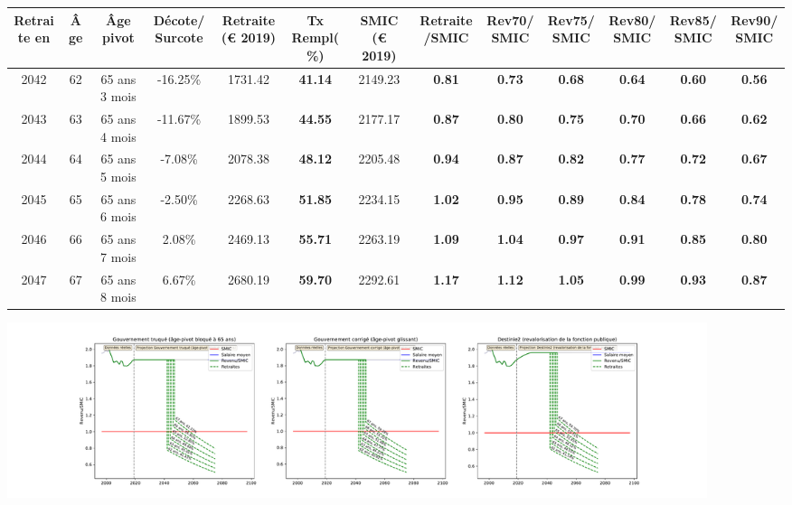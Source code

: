 { \scriptsize \begin{center} 
\begin{tabular}[htb]{|c|c||c|c||c|c||c||c|c|c|c|c|c|} 
\hline 
 Retraite en &  Âge &  Âge pivot &  Décote/Surcote &  Retraite (\euro{} 2019) &  Tx Rempl(\%) &  SMIC (\euro{} 2019) &  Retraite/SMIC &  Rev70/SMIC &  Rev75/SMIC &  Rev80/SMIC &  Rev85/SMIC &  Rev90/SMIC \\ 
\hline \hline 
 2042 &  62 &  65 ans 3 mois &  -16.25\% &  1731.42 &  {\bf 41.14} &  2149.23 &  {\bf {\color{red} 0.81}} &  {\bf {\color{red} 0.73}} &  {\bf {\color{red} 0.68}} &  {\bf {\color{red} 0.64}} &  {\bf {\color{red} 0.60}} &  {\bf {\color{red} 0.56}} \\ 
\hline 
 2043 &  63 &  65 ans 4 mois &  -11.67\% &  1899.53 &  {\bf 44.55} &  2177.17 &  {\bf {\color{red} 0.87}} &  {\bf {\color{red} 0.80}} &  {\bf {\color{red} 0.75}} &  {\bf {\color{red} 0.70}} &  {\bf {\color{red} 0.66}} &  {\bf {\color{red} 0.62}} \\ 
\hline 
 2044 &  64 &  65 ans 5 mois &  -7.08\% &  2078.38 &  {\bf 48.12} &  2205.48 &  {\bf {\color{red} 0.94}} &  {\bf {\color{red} 0.87}} &  {\bf {\color{red} 0.82}} &  {\bf {\color{red} 0.77}} &  {\bf {\color{red} 0.72}} &  {\bf {\color{red} 0.67}} \\ 
\hline 
 2045 &  65 &  65 ans 6 mois &  -2.50\% &  2268.63 &  {\bf 51.85} &  2234.15 &  {\bf 1.02} &  {\bf {\color{red} 0.95}} &  {\bf {\color{red} 0.89}} &  {\bf {\color{red} 0.84}} &  {\bf {\color{red} 0.78}} &  {\bf {\color{red} 0.74}} \\ 
\hline 
 2046 &  66 &  65 ans 7 mois &  2.08\% &  2469.13 &  {\bf 55.71} &  2263.19 &  {\bf 1.09} &  {\bf 1.04} &  {\bf {\color{red} 0.97}} &  {\bf {\color{red} 0.91}} &  {\bf {\color{red} 0.85}} &  {\bf {\color{red} 0.80}} \\ 
\hline 
 2047 &  67 &  65 ans 8 mois &  6.67\% &  2680.19 &  {\bf 59.70} &  2292.61 &  {\bf 1.17} &  {\bf 1.12} &  {\bf 1.05} &  {\bf {\color{red} 0.99}} &  {\bf {\color{red} 0.93}} &  {\bf {\color{red} 0.87}} \\ 
\hline 
\hline 
\end{tabular} 
\end{center} } 

 \begin{center}\includegraphics[width=0.9\textwidth]{fig/SMPT_1980_22_dest_retraite.pdf}\end{center} \label{fig/SMPT_1980_22_dest_retraite.pdf} 

